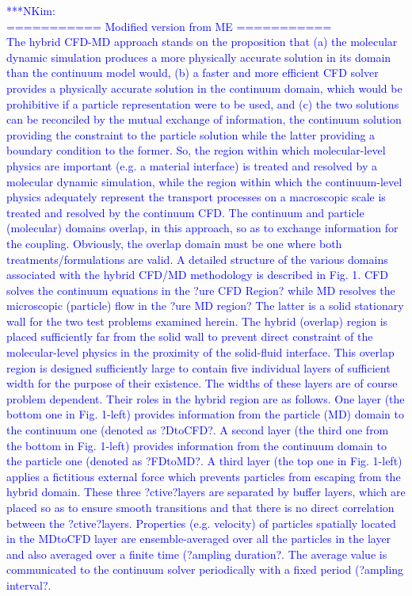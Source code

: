 \documentclass[preprint,12pt]{elsarticle}
\newcommand{\Nkimnote}[1]{ {\textcolor{blue} { ***NKim: #1 }}}
\newcommand{\Nkimnote}[1]{}
\begin{document}
\Nkimnote{
\\=========== Modified version from ME ===========\\
The hybrid CFD-MD approach stands on the proposition that (a) the molecular dynamic simulation produces a more physically accurate solution in its domain than the continuum model would, (b) a faster and more efficient CFD solver provides a physically accurate solution in the continuum domain, which would be prohibitive if a particle representation were to be used, and (c) the two solutions can be reconciled by the mutual exchange of information, the continuum solution providing the constraint to the particle solution while the latter providing a boundary condition to the former. So, the region within which molecular-level physics are important (e.g. a material interface) is treated and resolved by a molecular dynamic simulation, while the region within which the continuum-level physics adequately represent the transport processes on a macroscopic scale is treated and resolved by the continuum CFD. The continuum and particle (molecular) domains overlap, in this approach, so as to exchange information for the coupling. Obviously, the overlap domain must be one where both treatments/formulations are valid.
A detailed structure of the various domains associated with the hybrid CFD/MD methodology is described in Fig. 1. CFD solves the continuum equations in the ?ure CFD Region? while MD resolves the microscopic (particle) flow in the ?ure MD region? The latter is a solid stationary wall for the two test problems examined herein. The hybrid (overlap) region is placed sufficiently far from the solid wall to prevent direct constraint of the molecular-level physics in the proximity of the solid-fluid interface. 
This overlap region is designed sufficiently large to contain five individual layers of sufficient width for the purpose of their existence. The widths of these layers are of course problem dependent. Their roles in the hybrid region are as follows. One layer (the bottom one in Fig. 1-left) provides information from the particle (MD) domain to the continuum one (denoted as ?DtoCFD?. A second layer (the third one from the bottom in Fig. 1-left) provides information from the continuum domain to the particle one (denoted as ?FDtoMD?. A third layer (the top one in Fig. 1-left) applies a fictitious external force which prevents particles from escaping from the hybrid domain. These three ?ctive?layers are separated by buffer layers, which are placed so as to ensure smooth transitions and that there is no direct correlation between the ?ctive?layers. Properties (e.g. velocity) of particles spatially located in the MDtoCFD layer are ensemble-averaged over all the particles in the layer and also averaged over a finite time (?ampling duration?. The average value is communicated to the continuum solver periodically with a fixed period (?ampling interval?.
}
\end{document}
